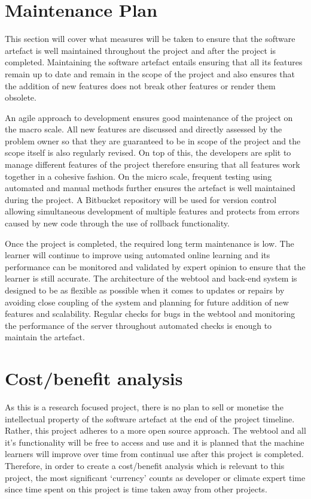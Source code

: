 \documentclass[11pt]{article} %
\numberwithin{equation}{section}
\begin{document}
\section{Maintenance Plan}
This section will cover what measures will be taken to ensure that the software artefact is well maintained throughout the project and after the project is completed. Maintaining the software artefact entails ensuring that all its features remain up to date and remain in the scope of the project and also ensures that the addition of new features does not break other features or render them obsolete.\par

An agile approach to development ensures good maintenance of the project on the macro scale. All new features are discussed and directly assessed by the problem owner so that they are guaranteed to be in scope of the project and the scope itself is also regularly revised. On top of this, the developers are split to manage different features of the project therefore ensuring that all features work together in a cohesive fashion. On the micro scale, frequent testing using automated and manual methods further ensures the artefact is well maintained during the project. A Bitbucket repository will be used for version control allowing simultaneous development of multiple features and protects from errors caused by new code through the use of rollback functionality.\par

Once the project is completed, the required long term maintenance is low. The learner will continue to improve using automated online learning and its performance can be monitored and validated by expert opinion to ensure that the learner is still accurate. The architecture of the webtool and back-end system is designed to be as flexible as possible when it comes to updates or repairs by avoiding close coupling of the system and planning for future addition of new features and scalability. Regular checks for bugs in the webtool and monitoring the performance of the server throughout automated checks is enough to maintain the artefact.

\section{Cost/benefit analysis}
As this is a research focused project, there is no plan to sell or monetise the intellectual property of the software artefact at the end of the project timeline. Rather, this project adheres to a more open source approach. The webtool and all it’s functionality will be free to access and use and it is planned that the machine learners will improve over time from continual use after this project is completed. Therefore, in order to create a cost/benefit analysis which is relevant to this project, the most significant ‘currency’ counts as developer or climate expert time since time spent on this project is time taken away from other projects.
\end{document}
